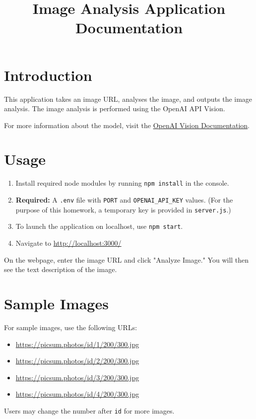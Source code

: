 \documentclass{article}
\title{Image Analysis Application Documentation}
\author{}
\date{}
\begin{document}
\maketitle

\section{Introduction}
This application takes an image URL, analyses the image, and outputs the image analysis. The image analysis is performed using the OpenAI API Vision.

For more information about the model, visit the \href{https://platform.openai.com/docs/guides/vision}{OpenAI Vision Documentation}.

\section{Usage}

\begin{enumerate}
    \item Install required node modules by running \texttt{npm install} in the console.
    \item \textbf{Required:} A \texttt{.env} file with \texttt{PORT} and \texttt{OPENAI\_API\_KEY} values. (For the purpose of this homework, a temporary key is provided in \texttt{server.js}.)
    \item To launch the application on localhost, use \texttt{npm start}.
    \item Navigate to \url{http://localhost:3000/}
\end{enumerate}

On the webpage, enter the image URL and click "Analyze Image." You will then see the text description of the image.

\section{Sample Images}

For sample images, use the following URLs:

\begin{itemize}
    \item \url{https://picsum.photos/id/1/200/300.jpg}
    \item \url{https://picsum.photos/id/2/200/300.jpg}
    \item \url{https://picsum.photos/id/3/200/300.jpg}
    \item \url{https://picsum.photos/id/4/200/300.jpg}
\end{itemize}

Users may change the number after \texttt{id} for more images.
\end{document}
